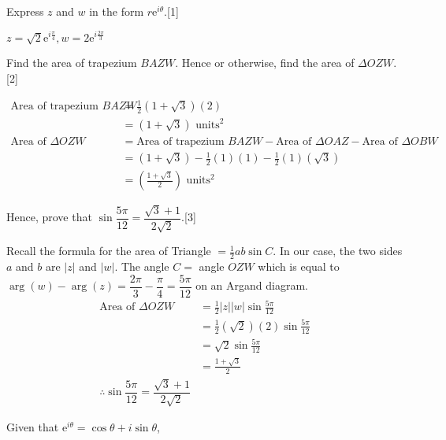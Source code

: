 \documentclass[12pt, a4 paper]{article}
\begin{document}
\begin{outline}[enumerate]
	\2 Express $z$ and $w$ in the form $r\mathrm{e}^{i\theta}$.\hfill[1]
	\begin{answer}
		$z=\sqrt{2}\mathrm{e}^{i\frac{\pi}{4}}, w=2\mathrm{e}^{i\frac{2\pi}{3}}$
	\end{answer}    
	\2 Find the area of trapezium $BAZW$. Hence or otherwise, find the area of $\Delta OZW$.\hfill[2]
	\begin{answer}
		\begin{align*}
			\textrm{Area of trapezium }BAZW & = \frac{1}{2}(1+\sqrt{3})(2)                                                                  \\
			                                & = (1+\sqrt{3})\textrm{ units}^2                                                               \\
			\textrm{Area of }\Delta OZW     & = \textrm{Area of trapezium }BAZW - \textrm{Area of }\Delta OAZ - \textrm{Area of }\Delta OBW \\
			                                & = (1+\sqrt{3}) - \frac{1}{2}(1)(1) - \frac{1}{2}(1)(\sqrt{3})                                 \\
			                                & = (\frac{1+\sqrt{3}}{2})\textrm{ units}^2                                                     
		\end{align*}
	\end{answer}           
	\2 Hence, prove that $\sin{\dfrac{5\pi}{12}}=\dfrac{\sqrt{3}+1}{2\sqrt{2}}$.\hfill[3]
	\begin{answer}
		Recall the formula for the area of Triangle $= \frac{1}{2}ab \sin C$. In our case, the two sides $a$ and $b$ are $|z|$ and $|w|$. The angle $C=$ angle $OZW$ which is equal to $\arg{(w)} - \arg{(z)}=\dfrac{2\pi}{3} - \dfrac{\pi}{4} = \dfrac{5\pi}{12}$ on an Argand diagram.
		\begin{align*}
			\textrm{Area of }\Delta OZW & = \frac{1}{2}|z||w|\sin{\frac{5\pi}{12}}        \\
			                            & = \frac{1}{2}(\sqrt{2})(2)\sin{\frac{5\pi}{12}} \\
			                            & = \sqrt{2}\sin{\frac{5\pi}{12}}                 \\
			                            & = \frac{1+\sqrt{3}}{2}                          \\
			\therefore \sin{\dfrac{5\pi}{12}}=\dfrac{\sqrt{3}+1}{2\sqrt{2}}
		\end{align*}
	\end{answer}       
	\1 Given that $\mathrm{e}^{i\theta}=\cos{\theta}+i\sin{\theta}$, %
		    

\end{outline}
\end{document}

